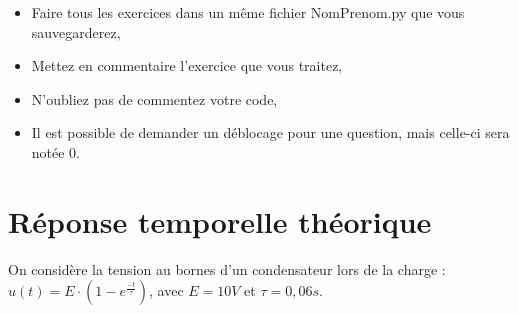 \documentclass[a4paper,12pt]{article}
\begin{document}

 \begin{center}
  \begin{large}
  \end{large}
 \end{center}

\begin{boxedminipage}{.9\textwidth} 
\begin{itemize}
 \item Faire tous les exercices dans un même fichier NomPrenom.py que vous sauvegarderez,
 \item Mettez en commentaire l'exercice que vous traitez,
 \item N'oubliez pas de commentez votre code,
 \item Il est possible de demander un déblocage pour une question, mais celle-ci sera notée 0.
\end{itemize}
\end{boxedminipage}

\section*{Réponse temporelle théorique}
\noi On considère la tension au bornes d'un condensateur lors de la charge : $u(t)=E\cdot(1-e^{\frac{-t}{\tau}})$, avec $E=10V$ et $\tau=0,06s$.
\end{document}

